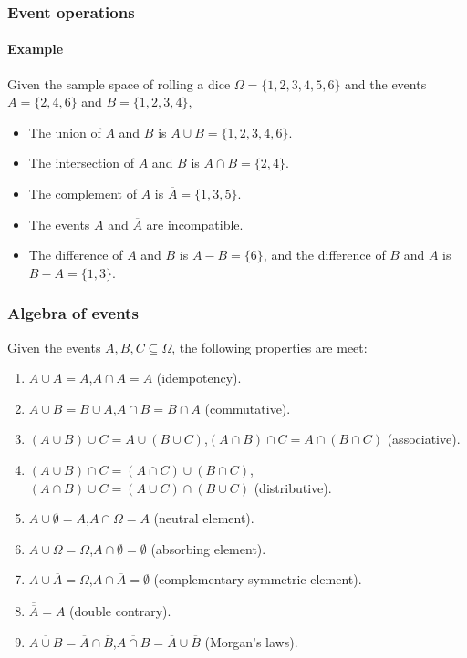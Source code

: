 \begin{frame}
\frametitle{Event operations}
\framesubtitle{Example}
Given the sample space of rolling a dice $\Omega=\{1,2,3,4,5,6\}$ and the events $A=\{2,4,6\}$ and $B=\{1,2,3,4\}$, 
\begin{itemize}
\item The union of $A$ and $B$ is $A\cup B=\{1,2,3,4,6\}$.
\item The intersection of $A$ and $B$ is $A\cap B=\{2,4\}$.
\item The complement of $A$ is $\overline A=\{1,3,5\}$.
\item The events $A$ and $\overline A$ are incompatible.
\item The difference of $A$ and $B$ is $A-B=\{6\}$, and the difference of $B$ and $A$ is $B-A=\{1,3\}$.
\end{itemize}
\end{frame}


\begin{frame}
\frametitle{Algebra of events}
Given the events $A,B,C\subseteq \Omega$, the following properties are meet: 
\begin{enumerate}[<+->]
\item $A\cup A=A$,\quad $A\cap A=A$ (idempotency).
\item $A\cup B=B\cup A$,\quad $A\cap B = B\cap A$ (commutative).
\item $(A\cup B)\cup C = A\cup (B\cup C)$,\quad $(A\cap B)\cap C = A\cap (B\cap C)$ (associative).
\item $(A\cup B)\cap C = (A\cap C)\cup (B\cap C)$,\quad $(A\cap B)\cup C = (A\cup C)\cap (B\cup C)$ (distributive).
\item $A\cup \emptyset=A$,\quad $A\cap \Omega=A$ (neutral element).
\item $A\cup \Omega=\Omega$,\quad $A\cap \emptyset=\emptyset$ (absorbing element).
\item $A\cup \overline A = \Omega$,\quad $A\cap \overline A= \emptyset$ (complementary symmetric element).
\item $\overline{\overline A} = A$ (double contrary).
\item $\overline{A\cup B} = \overline A\cap \overline B$,\quad $\overline{A\cap B} = \overline A\cup \overline B$ (Morgan's
laws).
\end{enumerate}
\end{frame}


